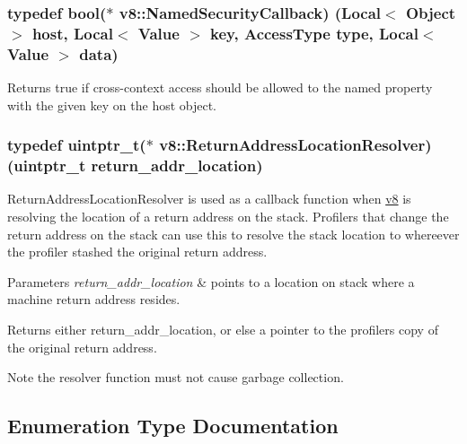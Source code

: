 \subsubsection[{Named\+Security\+Callback}]{\setlength{\rightskip}{0pt plus 5cm}typedef bool($\ast$ v8\+::\+Named\+Security\+Callback) ({\bf Local}$<$ {\bf Object} $>$ host, {\bf Local}$<$ {\bf Value} $>$ key, {\bf Access\+Type} type, {\bf Local}$<$ {\bf Value} $>$ data)}\label{namespacev8_ab5cafda0c556bba990c660ce9c904e0d}
Returns true if cross-\/context access should be allowed to the named property with the given key on the host object. \hypertarget{namespacev8_a8ce54c75241be41ff6a25e9944eefd2a}{}
\subsubsection[{Return\+Address\+Location\+Resolver}]{\setlength{\rightskip}{0pt plus 5cm}typedef uintptr\+\_\+t($\ast$ v8\+::\+Return\+Address\+Location\+Resolver) (uintptr\+\_\+t return\+\_\+addr\+\_\+location)}\label{namespacev8_a8ce54c75241be41ff6a25e9944eefd2a}
Return\+Address\+Location\+Resolver is used as a callback function when \hyperlink{namespacev8}{v8} is resolving the location of a return address on the stack. Profilers that change the return address on the stack can use this to resolve the stack location to whereever the profiler stashed the original return address.


\begin{DoxyParams}{Parameters}
{\em return\+\_\+addr\+\_\+location} & points to a location on stack where a machine return address resides. \\
\hline
\end{DoxyParams}
\begin{DoxyReturn}{Returns}
either return\+\_\+addr\+\_\+location, or else a pointer to the profiler\textquotesingle{}s copy of the original return address.
\end{DoxyReturn}
\begin{DoxyNote}{Note}
the resolver function must not cause garbage collection. 
\end{DoxyNote}


\subsection{Enumeration Type Documentation}
\hypertarget{namespacev8_a31d8355cb043d7d2dda3f4a52760b64e}{}
